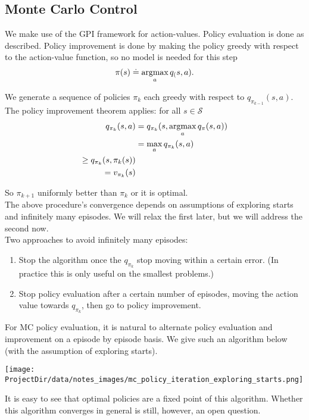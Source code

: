 \subsection{Monte Carlo Control}
We make use of the GPI framework for action-values. Policy evaluation is done as described. Policy improvement is done by making the policy greedy with respect to the action-value function, so no model is needed for this step
\[
    \pi(s) \doteq \operatorname*{argmax}_a q_(s, a).
\]

We generate a sequence of policies $\pi_k$ each greedy with respect to $q_{\pi_{k-1}}(s, a)$. The policy improvement theorem applies: for all $s \in \mathcal{S}$
\begin{align}
    q_{\pi_k}(s, a) &= q_{\pi_k}(s, \operatorname*{argmax}_a q_\pi(s, a)) \\
                    &= \max_a q_{\pi_k}(s, a) \\
                    \geq q_{\pi_k}(s, \pi_k(s))\\
                    = v_{\pi_k}(s)
\end{align}

So $\pi_{k+1}$ uniformly better than $\pi_k$ or it is optimal. \\

The above procedure's convergence depends on assumptions of exploring starts and infinitely many episodes. We will relax the first later, but we will address the second now.\\

Two approaches to avoid infinitely many episodes:
\begin{enumerate}
    \item Stop the algorithm once the $q_{\pi_k}$ stop moving within a certain error. (In practice this is only useful on the smallest problems.)
    \item Stop policy evaluation after a certain number of episodes, moving the action value towards $q_{\pi_k}$, then go to policy improvement.
\end{enumerate}

For MC policy evaluation, it is natural to alternate policy evaluation and improvement on a episode by episode basis. We give such an algorithm below (with the assumption of exploring starts).

\texttt{[image: \\ProjectDir/data/notes\_images/mc\_policy\_iteration\_exploring\_starts.png]}

It is easy to see that optimal policies are a fixed point of this algorithm. Whether this algorithm converges in general is still, however, an open question.

